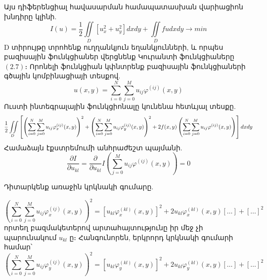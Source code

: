 \documentclass[fleqn, bachelor,subf,12pt,notitlepage]{article}
\newcommand\scalemath[2]{\scalebox{#1}{\mbox{\ensuremath{\displaystyle #2}}}}
\begin{document}
Այս դիֆերենցիալ հավասարման  համապատասխան վարիացիոն խնդիրը կլինի.
\begin{equation}
I(u) = \frac{1}{2}\iint \limits_{D} \left[u_x^2 + u_y^2 \right]dxdy + \iint \limits_{D} fudxdy \longrightarrow min
\end{equation}
D տիրույթը տրոհենք ուղղանկյուն եղանկյունների, և որպես բազիսային ֆունկցիաներ վերցնենք Կուրանտի ֆունկցիաները $\left(2.7\right)$։
Որոնելի ֆունկցիան կփնտրենք բազիսային ֆունկցիաների գծային կոմբինացիայի տեսքով.
\begin{equation}
u(x,y) = \sum_{i=0}^{N} \sum_{j=0}^{M} u_{ij}\varphi^{(ij)}(x,y)
\end{equation}
Ուստի ինտեգրալային ֆունկցիոնալը կունենա հետևյալ տեսքը.
\begin{equation}
$$\scalemath{0.9}{\frac{1}{2} \iint \limits_{D}\left[\left(\sum_{i=0}^{N} \sum_{j=0}^{M}u_{ij}\varphi_{x}^{(ij)}(x,y)\right)^2 + \left(\sum_{i=0}^{N} \sum_{j=0}^{M}u_{ij}\varphi_{y}^{(ij)}(x,y)\right)^2+2f(x,y)\left( \sum_{i=0}^{N} \sum_{j=0}^{M}u_{ij}\varphi^{(ij)}(x,y)\right)\right]dxdy}
\end{equation}
Համաձայն էքստրեմումի անհրաժեշտ պայմանի.
$$\dfrac{\partial I}{ \partial u_{kl}} = \dfrac{\partial}{\partial u_{kl}} I \left(\sum_{j=0}^{M} u_{ij}\varphi^{(ij)}(x,y)\right) = 0 $$

Դիտարկենք առաջին կրկնակի գումարը.

$$\left(\sum_{i=0}^{N} \sum_{j=0}^{M}u_{ij}\varphi_{x}^{(ij)}(x,y)\right)^2 = \left[u_{kl}\varphi_{x}^{(kl)}(x,y)\right]^{2} + 2u_{kl}\varphi_{x}^{(kl)}(x,y)[\dots] + [\dots]^2$$
որտեղ բազմակետերով արտահայտությունը իր մեջ չի պարունակում $u_{kl}$ ը։
Հանգունորեն, երկրորդ կրկնակի գումարի համար՝
$$\left(\sum_{i=0}^{N} \sum_{j=0}^{M}u_{ij}\varphi_{y}^{(ij)}(x,y)\right)^2 = \left[u_{kl}\varphi_{y}^{(kl)}(x,y)\right]^{2} + 2u_{kl}\varphi_{y}^{(kl)}(x,y)[\dots] + [\dots]^2$$
\end{document}
